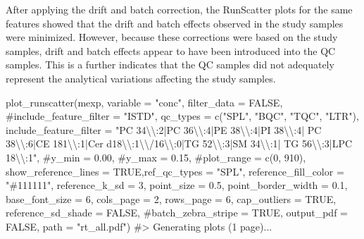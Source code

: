 \documentclass[
  letterpaper,
  DIV=11,
  numbers=noendperiod]{scrartcl}
\newenvironment{Shaded}{\begin{snugshade}}{\end{snugshade}}
\newcommand{\AttributeTok}[1]{\textcolor[rgb]{0.40,0.45,0.13}{#1}}
\newcommand{\CommentTok}[1]{\textcolor[rgb]{0.37,0.37,0.37}{#1}}
\newcommand{\ConstantTok}[1]{\textcolor[rgb]{0.56,0.35,0.01}{#1}}
\newcommand{\DecValTok}[1]{\textcolor[rgb]{0.68,0.00,0.00}{#1}}
\newcommand{\FloatTok}[1]{\textcolor[rgb]{0.68,0.00,0.00}{#1}}
\newcommand{\FunctionTok}[1]{\textcolor[rgb]{0.28,0.35,0.67}{#1}}
\newcommand{\NormalTok}[1]{\textcolor[rgb]{0.00,0.23,0.31}{#1}}
\newcommand{\SpecialCharTok}[1]{\textcolor[rgb]{0.37,0.37,0.37}{#1}}
\newcommand{\StringTok}[1]{\textcolor[rgb]{0.13,0.47,0.30}{#1}}
\begin{document}
After applying the drift and batch correction, the RunScatter plots for
the same features showed that the drift and batch effects observed in
the study samples were minimized. However, because these corrections
were based on the study samples, drift and batch effects appear to have
been introduced into the QC samples. This is a further indicates that
the QC samples did not adequately represent the analytical variations
affecting the study samples.

\begin{Shaded}
\begin{Highlighting}[]
\FunctionTok{plot\_runscatter}\NormalTok{(mexp, }\AttributeTok{variable =} \StringTok{"conc"}\NormalTok{, }
  \AttributeTok{filter\_data =} \ConstantTok{FALSE}\NormalTok{,}
  \CommentTok{\#include\_feature\_filter = "ISTD", }
  \AttributeTok{qc\_types =} \FunctionTok{c}\NormalTok{(}\StringTok{"SPL"}\NormalTok{, }\StringTok{"BQC"}\NormalTok{, }\StringTok{"TQC"}\NormalTok{, }\StringTok{"LTR"}\NormalTok{), }
  \AttributeTok{include\_feature\_filter =} \StringTok{"PC 34}\SpecialCharTok{\textbackslash{}\textbackslash{}}\StringTok{:2|PC 36}\SpecialCharTok{\textbackslash{}\textbackslash{}}\StringTok{:4|PE 38}\SpecialCharTok{\textbackslash{}\textbackslash{}}\StringTok{:4|PI 38}\SpecialCharTok{\textbackslash{}\textbackslash{}}\StringTok{:4|}
\StringTok{    PC 38}\SpecialCharTok{\textbackslash{}\textbackslash{}}\StringTok{:6|CE 181}\SpecialCharTok{\textbackslash{}\textbackslash{}}\StringTok{:1|Cer d18}\SpecialCharTok{\textbackslash{}\textbackslash{}}\StringTok{:1}\SpecialCharTok{\textbackslash{}\textbackslash{}}\StringTok{/16}\SpecialCharTok{\textbackslash{}\textbackslash{}}\StringTok{:0|TG 52}\SpecialCharTok{\textbackslash{}\textbackslash{}}\StringTok{:3|SM 34}\SpecialCharTok{\textbackslash{}\textbackslash{}}\StringTok{:1|}
\StringTok{    TG 56}\SpecialCharTok{\textbackslash{}\textbackslash{}}\StringTok{:3|LPC 18}\SpecialCharTok{\textbackslash{}\textbackslash{}}\StringTok{:1"}\NormalTok{,}
    \CommentTok{\#y\_min = 0.00,}
    \CommentTok{\#y\_max = 0.15,}
    \CommentTok{\#plot\_range = c(0, 910), }
    \AttributeTok{show\_reference\_lines =} \ConstantTok{TRUE}\NormalTok{,}\AttributeTok{ref\_qc\_types =} \StringTok{"SPL"}\NormalTok{,}
    \AttributeTok{reference\_fill\_color =} \StringTok{"\#111111"}\NormalTok{,}
    \AttributeTok{reference\_k\_sd =} \DecValTok{3}\NormalTok{,}
    \AttributeTok{point\_size =} \FloatTok{0.5}\NormalTok{,}
    \AttributeTok{point\_border\_width =} \FloatTok{0.1}\NormalTok{,}
    \AttributeTok{base\_font\_size =} \DecValTok{6}\NormalTok{,}
    \AttributeTok{cols\_page =} \DecValTok{2}\NormalTok{,}
    \AttributeTok{rows\_page =} \DecValTok{6}\NormalTok{,}
    \AttributeTok{cap\_outliers =} \ConstantTok{TRUE}\NormalTok{,}
    \AttributeTok{reference\_sd\_shade =} \ConstantTok{FALSE}\NormalTok{,}
    \CommentTok{\#batch\_zebra\_stripe = TRUE, }
    \AttributeTok{output\_pdf =} \ConstantTok{FALSE}\NormalTok{,}
    \AttributeTok{path =} \StringTok{"rt\_all.pdf"}\NormalTok{)}
\CommentTok{\#\textgreater{} Generating plots (1 page)...}
\end{Highlighting}
\end{Shaded}
\end{document}
